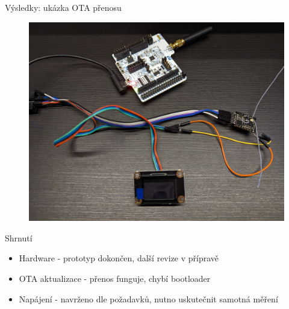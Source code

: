 \documentclass{beamer}
\begin{document}
\begin{frame}{Výsledky: ukázka OTA přenosu}
\begin{figure}[h]
    \centering
    \includegraphics[width=0.8\linewidth]{img/demo-setup.jpg}
\end{figure}
\end{frame}


\begin{frame}{Shrnutí}
\begin{itemize}
    \item Hardware - prototyp dokončen, další revize v přípravě
    \item OTA aktualizace - přenos funguje, chybí bootloader
    \item Napájení - navrženo dle požadavků, nutno uskutečnit samotná měření
\end{itemize}
\end{frame}
\end{document}
